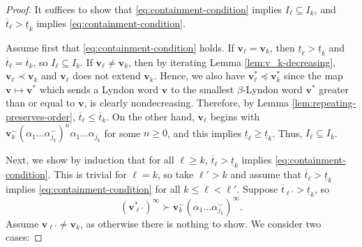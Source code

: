 \documentclass[10pt,a4paper]{amsart}
\newcommand{\al}{\alpha}
\newcommand{\f}{\infty}
\newcommand{\lle}{\preccurlyeq}
\renewcommand{\v}{\mathbf{v}}
\begin{document}
\begin{proof}
It suffices to show that \eqref{eq:containment-condition} implies $I_{\ell}\subseteq I_k$, and $\overline{t}_{\ell}>\underline{t}_k$ implies \eqref{eq:containment-condition}.

Assume first that \eqref{eq:containment-condition} holds. If $\v_{\ell}=\v_k$, then $\underline{t}_{\ell}>\underline{t}_k$ and $\overline{t}_{\ell}=\overline{t}_k$, so $I_{\ell}\subseteq I_k$. If $\v_{\ell}\neq \v_k$, then by iterating Lemma \ref{lem:v_k-decreasing}, $\v_{\ell}\prec \v_k$ and $\v_{\ell}$ does not extend $\v_k$. Hence, we also have $\v_{\ell}^*\lle \v_k^*$ since the map $\v\mapsto \v^*$ which sends a Lyndon word $\v$ to the smallest $\beta$-Lyndon word $\v^*$ greater than or equal to $\v$, is clearly nondecreasing. Therefore, {by Lemma \ref{lem:repeating-preserves-order}}, $\overline{t}_{\ell}\leq \overline{t}_k$. On the other hand, $\v_\ell$ begins with $\v_k^-(\al_1\dots\al_{j_k}^-)^n\al_1\dots\al_{j_k}$ for some $n\geq 0$, and this implies $\underline{t}_\ell\geq \underline{t}_k$. Thus, $I_\ell\subseteq I_k$.

Next, we show by induction that for all $\ell\geq k$,
$\overline{t}_{\ell}>\underline{t}_k$ implies \eqref{eq:containment-condition}.
This is trivial for $\ell=k$, so take $\ell'>k$ and assume that $\overline{t}_{\ell}>\underline{t}_k$ implies \eqref{eq:containment-condition} for all $k\leq \ell<\ell'$. Suppose $\overline{t}_{\ell'}>\underline{t}_k$, so
\begin{equation} \label{eq:v_l-v_k-inequality}
(\v_{\ell'}^*)^\f \succ \v_k^-(\al_1\dots\al_{j_k}^-)^\f.
\end{equation}
Assume $\v_{\ell'}\neq \v_k$, as otherwise there is nothing to show.
We consider two cases:


\end{proof}
\end{document}
